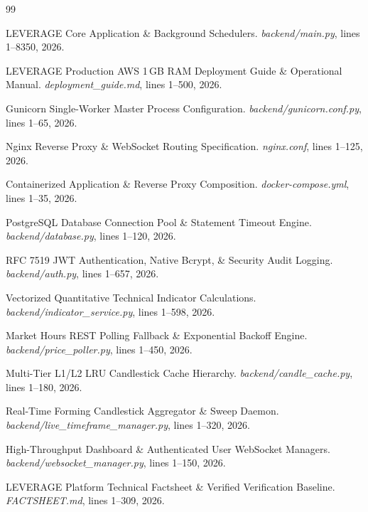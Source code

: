 \documentclass[11pt,a4paper,oneside,openany]{report}
\begin{document}
\appendix





\newpage
\begin{thebibliography}{99}

LEVERAGE Core Application \& Background Schedulers.
\emph{backend/main.py}, lines 1--8350, 2026.

LEVERAGE Production AWS 1\,GB RAM Deployment Guide \& Operational Manual.
\emph{deployment\_guide.md}, lines 1--500, 2026.

Gunicorn Single-Worker Master Process Configuration.
\emph{backend/gunicorn.conf.py}, lines 1--65, 2026.

Nginx Reverse Proxy \& WebSocket Routing Specification.
\emph{nginx.conf}, lines 1--125, 2026.

Containerized Application \& Reverse Proxy Composition.
\emph{docker-compose.yml}, lines 1--35, 2026.

PostgreSQL Database Connection Pool \& Statement Timeout Engine.
\emph{backend/database.py}, lines 1--120, 2026.

RFC 7519 JWT Authentication, Native Bcrypt, \& Security Audit Logging.
\emph{backend/auth.py}, lines 1--657, 2026.

Vectorized Quantitative Technical Indicator Calculations.
\emph{backend/indicator\_service.py}, lines 1--598, 2026.

Market Hours REST Polling Fallback \& Exponential Backoff Engine.
\emph{backend/price\_poller.py}, lines 1--450, 2026.

Multi-Tier L1/L2 LRU Candlestick Cache Hierarchy.
\emph{backend/candle\_cache.py}, lines 1--180, 2026.

Real-Time Forming Candlestick Aggregator \& Sweep Daemon.
\emph{backend/live\_timeframe\_manager.py}, lines 1--320, 2026.

High-Throughput Dashboard \& Authenticated User WebSocket Managers.
\emph{backend/websocket\_manager.py}, lines 1--150, 2026.

LEVERAGE Platform Technical Factsheet \& Verified Verification Baseline.
\emph{FACTSHEET.md}, lines 1--309, 2026.

\end{thebibliography}
\end{document}
